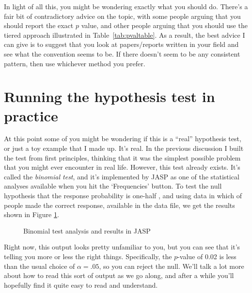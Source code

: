 In light of all this, you might be wondering exactly what you should do. There's a fair bit of contradictory advice on the topic, with some people arguing that you should report the exact $p$ value, and other people arguing that you should use the tiered approach illustrated in Table~\ref{tab:pvaltable}. As a result, the best advice I can give is to suggest that you look at papers/reports written in your field and see what the convention seems to be. If there doesn't seem to be any consistent pattern, then use whichever method you prefer. 


\section{Running the hypothesis test in practice~\label{sec:runhyp}}

At this point some of you might be wondering if this is a ``real'' hypothesis test, or just a toy example that I made up. It's real. In the previous discussion I built the test from first principles, thinking that it was the simplest possible problem that you might ever encounter in real life. However, this test already exists. It's called the {\it binomial test}, and it's implemented by JASP as one of the statistical analyses available when you hit the `Frequencies' button. To test the null hypothesis that the response probability is one-half , and using data in which  of  people made the correct response, available in the  data file, we get the results shown in Figure \ref{fig:binomialtest}.

\begin{figure}[ht]
\begin{center}
\caption{Binomial test analysis and results in JASP}
\HR
\label{fig:binomialtest}
\end{center}
\end{figure}

Right now, this output looks pretty unfamiliar to you, but you can see that it's telling you more or less the right things. Specifically, the $p$-value of 0.02 is less than the usual choice of $\alpha = .05$, so you can reject the null. We'll talk a lot more about how to read this sort of output as we go along, and after a while you'll hopefully find it quite easy to read and understand. 


